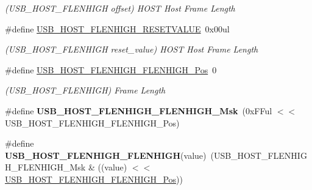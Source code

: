 \begin{DoxyCompactItemize}
\begin{DoxyCompactList}\small\item\em (U\+S\+B\+\_\+\+H\+O\+S\+T\+\_\+\+F\+L\+E\+N\+H\+I\+G\+H offset) H\+O\+S\+T Host Frame Length \end{DoxyCompactList}\item 
\hypertarget{group___s_a_m_l21___u_s_b_ga0a62c5665d87352977c007e02be7b860}{}\#define \hyperlink{group___s_a_m_l21___u_s_b_ga0a62c5665d87352977c007e02be7b860}{U\+S\+B\+\_\+\+H\+O\+S\+T\+\_\+\+F\+L\+E\+N\+H\+I\+G\+H\+\_\+\+R\+E\+S\+E\+T\+V\+A\+L\+U\+E}~0x00ul\label{group___s_a_m_l21___u_s_b_ga0a62c5665d87352977c007e02be7b860}

\begin{DoxyCompactList}\small\item\em (U\+S\+B\+\_\+\+H\+O\+S\+T\+\_\+\+F\+L\+E\+N\+H\+I\+G\+H reset\+\_\+value) H\+O\+S\+T Host Frame Length \end{DoxyCompactList}\item 
\hypertarget{group___s_a_m_l21___u_s_b_ga8d625c02119e0425aa2978a1c406e3ac}{}\#define \hyperlink{group___s_a_m_l21___u_s_b_ga8d625c02119e0425aa2978a1c406e3ac}{U\+S\+B\+\_\+\+H\+O\+S\+T\+\_\+\+F\+L\+E\+N\+H\+I\+G\+H\+\_\+\+F\+L\+E\+N\+H\+I\+G\+H\+\_\+\+Pos}~0\label{group___s_a_m_l21___u_s_b_ga8d625c02119e0425aa2978a1c406e3ac}

\begin{DoxyCompactList}\small\item\em (U\+S\+B\+\_\+\+H\+O\+S\+T\+\_\+\+F\+L\+E\+N\+H\+I\+G\+H) Frame Length \end{DoxyCompactList}\item 
\hypertarget{group___s_a_m_l21___u_s_b_ga09132daffbc71b91ff5b3e7cbfdbf0d8}{}\#define {\bfseries U\+S\+B\+\_\+\+H\+O\+S\+T\+\_\+\+F\+L\+E\+N\+H\+I\+G\+H\+\_\+\+F\+L\+E\+N\+H\+I\+G\+H\+\_\+\+Msk}~(0x\+F\+Ful $<$$<$ U\+S\+B\+\_\+\+H\+O\+S\+T\+\_\+\+F\+L\+E\+N\+H\+I\+G\+H\+\_\+\+F\+L\+E\+N\+H\+I\+G\+H\+\_\+\+Pos)\label{group___s_a_m_l21___u_s_b_ga09132daffbc71b91ff5b3e7cbfdbf0d8}

\item 
\hypertarget{group___s_a_m_l21___u_s_b_ga2aab7c42c54055ed6771bc7ae3655bb9}{}\#define {\bfseries U\+S\+B\+\_\+\+H\+O\+S\+T\+\_\+\+F\+L\+E\+N\+H\+I\+G\+H\+\_\+\+F\+L\+E\+N\+H\+I\+G\+H}(value)~(U\+S\+B\+\_\+\+H\+O\+S\+T\+\_\+\+F\+L\+E\+N\+H\+I\+G\+H\+\_\+\+F\+L\+E\+N\+H\+I\+G\+H\+\_\+\+Msk \& ((value) $<$$<$ \hyperlink{group___s_a_m_l21___u_s_b_ga8d625c02119e0425aa2978a1c406e3ac}{U\+S\+B\+\_\+\+H\+O\+S\+T\+\_\+\+F\+L\+E\+N\+H\+I\+G\+H\+\_\+\+F\+L\+E\+N\+H\+I\+G\+H\+\_\+\+Pos}))\label{group___s_a_m_l21___u_s_b_ga2aab7c42c54055ed6771bc7ae3655bb9}


\end{DoxyCompactItemize}

